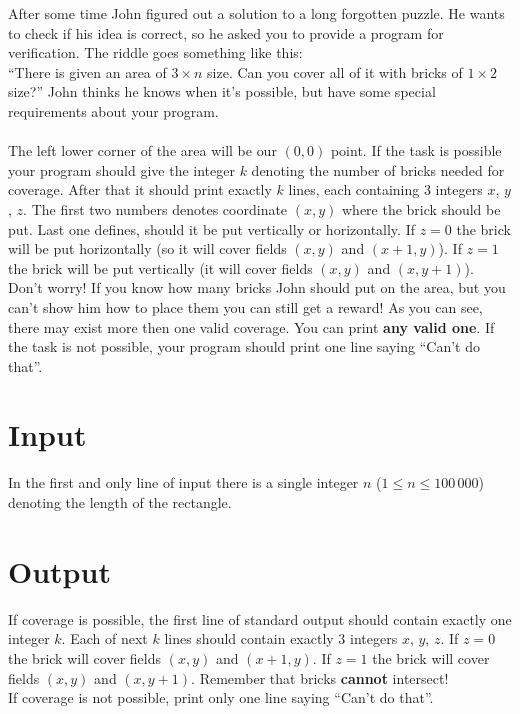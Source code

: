 \documentclass[en]{spiral}
\begin{document}
  \makeheader

  \noindent
  After some time John figured out a solution to a long forgotten puzzle.
  He wants to check if his idea is correct, so he asked you to provide a program for verification.
  The riddle goes something like this:\\
  ``There is given an area of $3 \times n$ size. Can you cover all of it with bricks of $1 \times 2$ size?''
  John thinks he knows when it's possible, but have some special requirements about your program.\\ \\
  The left lower corner of the area will be our $(0, 0)$ point.
  If the task is possible your program should give the integer $k$
  denoting the number of bricks needed for coverage.
  After that it should print exactly $k$ lines, each containing 3 integers $x$, $y$, $z$.
  The first two numbers denotes coordinate $(x, y)$ where the brick should be put.
  Last one defines, should it be put vertically or horizontally.
  If $z = 0$ the brick will be put horizontally (so it will cover fields $(x, y)$ and $(x + 1, y)$).
  If $z = 1$ the brick will be put vertically (it will cover fields $(x, y)$ and $(x, y + 1)$).
  Don't worry! If you know how many bricks John should put on the area,
  but you can't show him how to place them you can still get a reward!
  As you can see, there may exist more then one valid coverage. You can print \textbf{any valid one}.
  If the task is not possible, your program should print one line saying ``Can't do that''.


  \section{Input}

    In the first and only line of input there is
    a single integer $n$ ($1 \leq n \leq 100\,000$) denoting the length of the rectangle.

  \section{Output}

    If coverage is possible, the first line of standard output should contain exactly one integer $k$.
    Each of next $k$ lines should contain exactly 3 integers $x$, $y$, $z$.
    If $z = 0$ the brick will cover fields $(x, y)$ and $(x + 1, y)$.
    If $z = 1$ the brick will cover fields $(x, y)$ and $(x, y + 1)$.
    Remember that bricks \textbf{cannot} intersect!\\
    If coverage is not possible, print only one line saying ``Can't do that''.
    

\end{document}
